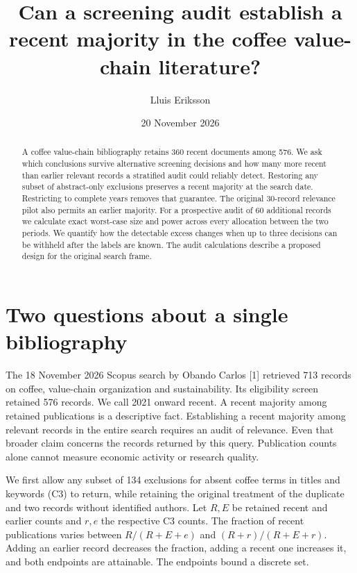 \documentclass[11pt]{article}
\title{Can a screening audit establish a recent majority in the coffee value-chain literature?}
\author{Lluis Eriksson}
\date{20 November 2026}
\begin{document}
\maketitle
\begin{abstract}
A coffee value-chain bibliography retains 360 recent documents among 576. We ask which conclusions survive alternative screening decisions and how many more recent than earlier relevant records a stratified audit could reliably detect. Restoring any subset of abstract-only exclusions preserves a recent majority at the search date. Restricting to complete years removes that guarantee. The original 30-record relevance pilot also permits an earlier majority. For a prospective audit of 60 additional records we calculate exact worst-case size and power across every allocation between the two periods. We quantify how the detectable excess changes when up to three decisions can be withheld after the labels are known. The audit calculations describe a proposed design for the original search frame.
\end{abstract}
\section{Two questions about a single bibliography}
The 18 November 2026 Scopus search by Obando Carlos [1] retrieved 713 records on coffee, value-chain organization and sustainability. Its eligibility screen retained 576 records. We call 2021 onward recent. A recent majority among retained publications is a descriptive fact. Establishing a recent majority among relevant records in the entire search requires an audit of relevance. Even that broader claim concerns the records returned by this query. Publication counts alone cannot measure economic activity or research quality.

We first allow any subset of 134 exclusions for absent coffee terms in titles and keywords (C3) to return, while retaining the original treatment of the duplicate and two records without identified authors. Let $R,E$ be retained recent and earlier counts and $r,e$ the respective C3 counts. The fraction of recent publications varies between $R/(R+E+e)$ and $(R+r)/(R+E+r)$. Adding an earlier record decreases the fraction, adding a recent one increases it, and both endpoints are attainable. The endpoints bound a discrete set.
\newpage
\end{document}
